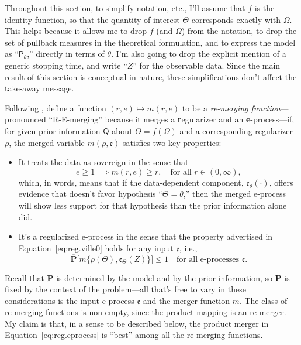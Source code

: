 \documentclass[a4paper, 12pt]{article}
\theoremstyle{plain}
\theoremstyle{definition}
\theoremstyle{remark}
\newcommand{\prob}{\mathsf{P}}
\newcommand{\uprior}{\overline{\mathsf{Q}}}
\newcommand{\uuprob}{\mathbf{\overline{P}}}
\newcommand{\eval}{\mathfrak{e}}
\begin{document}
Throughout this section, to simplify notation, etc., I'll assume that $f$ is the identity function, so that the quantity of interest $\Theta$ corresponds exactly with $\Omega$.  This helps because it allows me to drop $f$ (and $\Omega$) from the notation, to drop the set of pullback measures in the theoretical formulation, and to express the model as ``$\prob_\theta$,'' directly in terms of $\theta$.  I'm also going to drop the explicit mention of a generic stopping time, and write ``$Z$'' for the observable data.  Since the main result of this section is conceptual in nature, these simplifications don't affect the take-away message.  

Following \citet{vovk.wang.2021}, define a function $(r,e) \mapsto m(r,e)$ to be a {\em re-merging function}---pronounced ``R-E-merging'' because it merges a {\bf r}egularizer and an {\bf e}-process---if, for  given prior information $\uprior$ about $\Theta=f(\Omega)$ and a corresponding regularizer $\rho$, the merged variable $m(\rho, \eval)$ satisfies two key properties:
\begin{itemize}
\item It treats the data as sovereign in the sense that 
\begin{equation}
\label{eq:sovereign}
e \geq 1 \implies m(r, e) \geq r, \quad \text{for all $r \in (0,\infty)$}, 
\end{equation}
which, in words, means that if the data-dependent component, $\eval_\theta(\cdot)$, offers evidence that doesn't favor hypothesis ``$\Theta=\theta$,'' then the merged e-process will show less support for that hypothesis than the prior information alone did.
\vspace{-2mm}
\item It's a regularized e-process in the sense that the property advertised in Equation~\eqref{eq:reg.ville0} holds for any input $\eval$, i.e., 
\begin{equation}
\label{eq:merging}
\uuprob\bigl[ m\{ \rho(\Theta), \eval_{\Theta}(Z) \} \bigr] \leq 1 \quad \text{for all e-processes $\eval$}. 
\end{equation}
\end{itemize} 
Recall that $\uuprob$ is determined by the model and by the prior information, so $\uuprob$ is fixed by the context of the problem---all that's free to vary in these considerations is the input e-process $\eval$ and the merger function $m$. The class of re-merging functions is non-empty, since the product mapping is an re-merger.  My claim is that, in a sense to be described below, the product merger in Equation~\eqref{eq:reg.eprocess} is ``best'' among all the re-merging functions.
\end{document}
